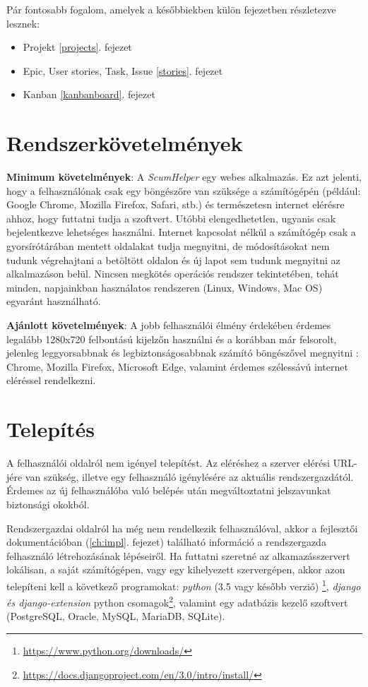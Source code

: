 Pár fontosabb fogalom, amelyek a későbbiekben külön fejezetben részletezve lesznek:
\begin{itemize}
	\item Projekt \ref{projects}. fejezet
	\item Epic, User stories, Task, Issue \ref{stories}. fejezet
	\item Kanban \ref{kanbanboard}. fejezet
\end{itemize}

\newpage

\section{Rendszerkövetelmények} %

\textbf{Minimum követelmények}: A \textit{ScumHelper} egy webes alkalmazás. Ez azt jelenti, hogy a felhasználónak csak egy böngészőre van szüksége a számítógépén (például: Google Chrome, Mozilla Firefox, Safari, stb.) és természetesn internet elérésre ahhoz, hogy futtatni tudja a szoftvert. Utóbbi elengedhetetlen, ugyanis csak bejelentkezve lehetséges használni. Internet kapcsolat nélkül a számítógép csak a gyorsírótárában mentett oldalakat tudja megnyitni, de módosításokat nem tudunk végrehajtani a betöltött oldalon és új lapot sem tudunk megnyitni az alkalmazáson belül. Nincsen megkötés operációs rendszer tekintetében, tehát minden, napjainkban használatos rendszeren (Linux, Windows, Mac OS) egyaránt használható. 

\textbf{Ajánlott követelmények}: A jobb felhasználói élmény érdekében érdemes legalább 1280x720 felbontású kijelzőn használni és a korábban már felsorolt, jelenleg leggyorsabbnak és legbiztonságosabbnak számító böngészővel megnyitni : Chrome, Mozilla Firefox, Microsoft Edge, valamint érdemes szélessávú internet eléréssel rendelkezni.

\section{Telepítés}
\label{install}

A felhasználói oldalról nem igényel telepítést. Az eléréshez a szerver elérési URL-jére van szükség, illetve egy felhasználó igénylésére az aktuális rendszergazdától. Érdemes az új felhasználóba való belépés után megváltoztatni jelszavunkat biztonsági okokból.

Rendszergazdai oldalról ha még nem rendelkezik felhasználóval, akkor a fejlesztői dokumentációban (\ref{ch:impl}. fejezet) található információ a rendszergazda felhasználó létrehozásának lépéseiről.  Ha futtatni szeretné az alkamazásszervert lokálisan, a saját számítógépen, vagy egy kihelyezett szervergépen, akkor azon telepíteni kell a következő programokat:  \textit{python} (3.5 vagy később verzió) \footnote{\url{https://www.python.org/downloads/}}, \textit{django és django-extension} python csomagok\footnote{\url{https://docs.djangoproject.com/en/3.0/intro/install/}}, valamint egy adatbázis kezelő szoftvert (PostgreSQL, Oracle, MySQL, MariaDB, SQLite).


